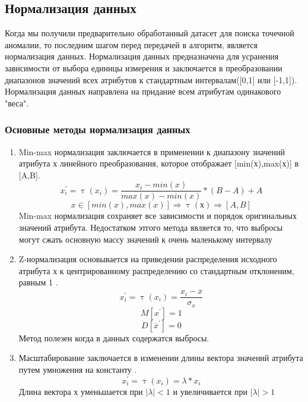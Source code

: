\subsection{Нормализация данных} 
Когда мы получили предварительно обработанный  датасет для поиска точечной аномалии, то последним шагом перед передачей в алгоритм, является нормализация данных. Нормализация данных предназначена для усранения зависимости от выбора единицы измерения и заключается в преобразовании диапазонов значений всех атрибутов к стандартным интервалам([0,1] или [-1,1])\cite{Book06}. Нормализация данных направлена на придание всем атрибутам одинакового "веса".
\subsubsection{Основные методы нормализация данных}
\begin{enumerate}
	\item Min-max нормализация заключается в применении к диапазону значений атрибута х линейного преобразования, которое отображает [min(х),max(х)] в [A,B].
	\begin{equation}
	x^\prime_i=\uptau(x_i)=\frac{x_i - min(x)}{max(x) - min(x)}*(B-A) + A
		\end{equation}
   \begin{equation}
		x \in[min(x), max(x)] \Rightarrow \uptau(х) \Rightarrow [A,B]
	\end{equation}
	Min-max нормализация сохраняет все зависимости и порядок оригинальных значений атрибута. Недостатком этгого метода является то, что выбросы могут сжать основную массу значений к очень маленькому интервалу
	\item Z-нормализация  основывается на приведении распределения исходного атрибута х  к центрированному распределению со стандартным отклоненим, равным 1 \cite{Book06} .
	\begin{equation}
	x^\prime_i=\uptau(x_i) =\frac{x_i - \overline{x}}{\sigma_x}
		\end{equation}
		\begin{equation}
		M[x^\prime]=1	 
		\end{equation}
		\begin{equation}
		D[\overline{x}^\prime]=0	 
		\end{equation}
		Метод полезен когда в данных содержатся выбросы.
	\item Масштабирование заключается в изменении длины вектора значений атрибута путем умножения на константу \cite{Book06} .
	\begin{equation}
	x^\prime_i=\uptau(x_i)=\lambda*x_i
	\end{equation}
	Длина вектора х уменьшается при $|\lambda|<1$ и увеличивается при $|\lambda|>1$ 
\end{enumerate}
